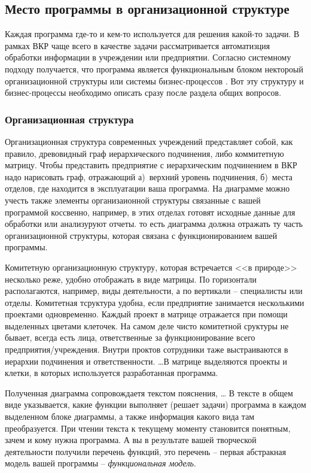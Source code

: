 \documentclass[a4paper,14pt,final]{extreport}
\begin{document}
\subsection{Место программы в организационной структуре}
\label{sec:designation}

Каждая программа где-то и кем-то используется для решения какой-то задачи.  В рамках ВКР чаще всего в качестве задачи рассматривается автоматизция обработки информации в учреждении или предприятии.  Согласно системному подходу \cite{sysap} получается, что программа является функциональным блоком нектороый организационной структуры или системы бизнес-процессов \cite{BP}.  Вот эту структуру и бизнес-процессы необходимо описать сразу после раздела общих вопросов.

\subsubsection{Организационная структура}
\label{sec:orgstruct}

Организационная структура современных учреждений представляет собой, как правило, древовидный граф иерархического подчинения, либо коммитетную матрицу.  Чтобы представить предприятие с иерархическим подчинением в ВКР надо нарисовать граф, отражающий а)~верхний уровень подчинения, б)~места отделов, где находится в эксплуатации ваша программа.  На диаграмме можно учесть также элементы организаионной структуры связанные с вашей программой коссвенно, например, в этих отделах готовят исходные данные для обработки или анализуруют отчеты.  то есть диаграмма должна отражать ту часть организационной структуры, которая связана с функционированием вашей программы.

Комитетную организационную структуру, которая встречается <<в природе>> несколько реже, удобно отображать в виде матрицы.  По горизонтали располагаются, например, виды деятельности, а по вертикали -- специалисты или отделы.  Комитетная тсруктура удобна, если предприятие занимается несколькими проектами одновременно.  Каждый проект в матрице отражается при помощи выделенных цветами клеточек.  На самом деле чисто комитетной сруктуры не бывает, всегда есть лица, ответственные за функционирование всего предприятия/учреждения.  Внутри проктов сотрудники таже выстраиваются в иерархии подчинения и ответственности.  \ldots{}В матрице выделяются проекты и клетки, в которых используется разработанная программа.

Полученная диаграмма сопровождаетя текстом пояснения, \ldots{}  В тексте в общем виде указывается, какие функции выполняет (решает задачи) программа в каждом выделенном блоке диаграммы, а также информация какого вида там преобразуется.  При чтении текста к текущему моменту становится понятным, зачем и кому нужна программа.  А вы в результате вашей творческой деятельности получили перечень функций, это перечень -- первая абстракная модель вашей программы -- \emph{функциональная модель}.
\end{document}
